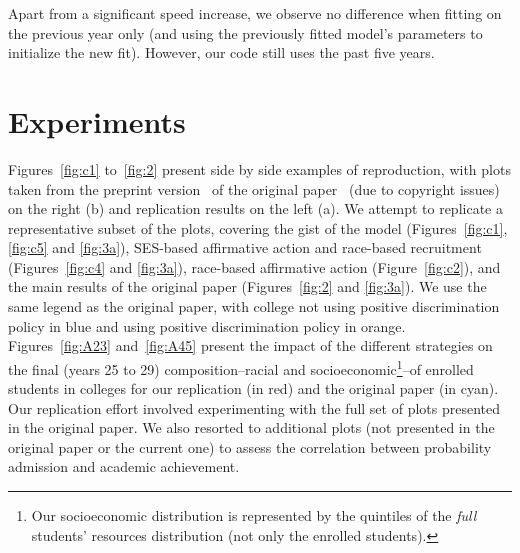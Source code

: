 Apart from a significant speed increase, we observe no difference when fitting on the previous year only (and using the previously fitted model's parameters to initialize the new fit). 
However, our code still uses the past five years.

\section{Experiments}

Figures~\ref{fig:c1} to~\ref{fig:2} present side by side examples of reproduction, with plots taken from the preprint version~\cite{reardon2018levels_preprint} of the original paper~\cite{reardon2018levels} (due to copyright issues) on the right (b) and replication results on the left (a).
We attempt to replicate a representative subset of the plots, covering the gist of the model (Figures~\ref{fig:c1}, \ref{fig:c5} and \ref{fig:3a}), SES-based affirmative action and race-based recruitment (Figures~\ref{fig:c4} and \ref{fig:3a}), race-based affirmative action (Figure~\ref{fig:c2}), and the main results of the original paper (Figures~\ref{fig:2}  and \ref{fig:3a}). We use the same legend as the original paper, with college not using positive discrimination policy in \colorbox{sns-blue}{blue} and using positive discrimination policy in \colorbox{sns-orange}{orange}.
Figures~\ref{fig:A23} and~\ref{fig:A45} present the impact of the different strategies on the final (years 25 to 29) composition--racial and socioeconomic\footnote{Our socioeconomic distribution is represented by the quintiles of the \emph{full} students' resources distribution (not only the enrolled students).}--of enrolled students in colleges for our replication (in \colorbox{sns-red}{red}) and the original paper (in \colorbox{sns-cyan}{cyan}).
Our replication effort involved experimenting with the full set of plots presented in the original paper. 
We also resorted to additional plots (not presented in the original paper or the current one) to assess the correlation between probability admission and academic achievement.

